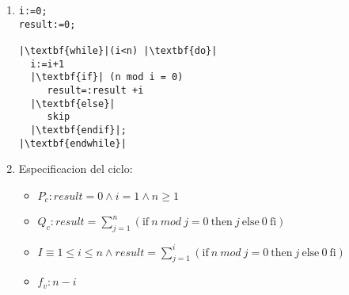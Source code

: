 \documentclass{article}
\begin{document}
\noindent
\begin{enumerate}[label=\alph*)]
	\item 

\begin{lstlisting}
i:=0;
result:=0;

|\textbf{while}|(i<n) |\textbf{do}|
  i:=i+1
  |\textbf{if}| (n mod i = 0) 
     result=:result +i
  |\textbf{else}|
     skip
  |\textbf{endif}|;
|\textbf{endwhile}|
\end{lstlisting}
	\item
	
 Especificacion del ciclo:
	\begin{itemize}
		\item $P_c: result=0 \wedge i=1\wedge n\geq 1$
		\item $Q_c:result=\sum_{j=1}^{n}(\textrm{if}\ n\ mod\ j=0\ \textrm{then}\ j\ \textrm{else}\ 0\ \textrm{fi})$
		\item $I\equiv 1\leq i\leq n \wedge result=\sum_{j=1}^{i}(\textrm{if}\ n\ mod\ j=0\ \textrm{then}\ j\ \textrm{else}\ 0\ \textrm{fi})$
		\item $f_v:n-i$
	\end{itemize}
	

\end{enumerate}
\end{document}
